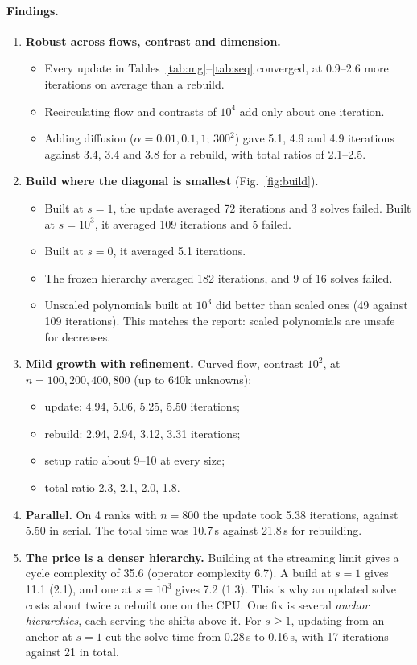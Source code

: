 \documentclass[11pt,a4paper]{article}
\begin{document}
\paragraph{Findings.}
\begin{enumerate}
\item \textbf{Robust across flows, contrast and dimension.}
  \begin{itemize}
  \item Every update in Tables~\ref{tab:mg}--\ref{tab:seq} converged, at 0.9--2.6 more iterations on average than a rebuild.
  \item Recirculating flow and contrasts of $10^4$ add only about one iteration.
  \item Adding diffusion ($\alpha=0.01,0.1,1$; $300^2$) gave 5.1, 4.9 and 4.9 iterations against 3.4, 3.4 and 3.8 for a rebuild, with total ratios of 2.1--2.5.
  \end{itemize}
\item \textbf{Build where the diagonal is smallest} (Fig.~\ref{fig:build}).
  \begin{itemize}
  \item Built at $s=1$, the update averaged 72 iterations and 3 solves failed. Built at $s=10^3$, it averaged 109 iterations and 5 failed.
  \item Built at $s=0$, it averaged 5.1 iterations.
  \item The frozen hierarchy averaged 182 iterations, and 9 of 16 solves failed.
  \item Unscaled polynomials built at $10^3$ did better than scaled ones (49 against 109 iterations). This matches the report: scaled polynomials are unsafe for decreases.
  \end{itemize}
\item \textbf{Mild growth with refinement.} Curved flow, contrast $10^2$, at $n=100,200,400,800$ (up to 640k unknowns):
  \begin{itemize}
  \item update: 4.94, 5.06, 5.25, 5.50 iterations;
  \item rebuild: 2.94, 2.94, 3.12, 3.31 iterations;
  \item setup ratio about 9--10 at every size;
  \item total ratio 2.3, 2.1, 2.0, 1.8.
  \end{itemize}
\item \textbf{Parallel.} On 4 ranks with $n=800$ the update took 5.38 iterations, against 5.50 in serial. The total time was 10.7\,s against 21.8\,s for rebuilding.
\item \textbf{The price is a denser hierarchy.} Building at the streaming limit gives a cycle complexity of 35.6 (operator complexity 6.7). A build at $s=1$ gives 11.1 (2.1), and one at $s=10^3$ gives 7.2 (1.3). This is why an updated solve costs about twice a rebuilt one on the CPU. One fix is several \emph{anchor hierarchies}, each serving the shifts above it. For $s\ge1$, updating from an anchor at $s=1$ cut the solve time from 0.28\,s to 0.16\,s, with 17 iterations against 21 in total.
\end{enumerate}
\end{document}
